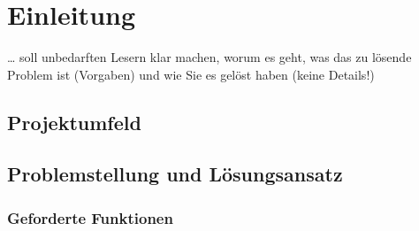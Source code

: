 \section{Einleitung}
… soll unbedarften Lesern klar machen, worum es geht, was das zu lösende
Problem ist (Vorgaben) und wie Sie es gelöst haben (keine Details!)

\subsection[Projektumfeld]{Projektumfeld}

\subsection[Problemstellung und Lösungsansatz]{Problemstellung und Lösungsansatz}

\subsubsection[Geforderte Funktionen]{Geforderte Funktionen}
